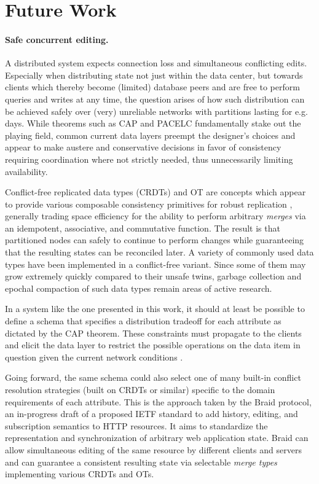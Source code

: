 \cleardoublepage
\section{Future Work}

\paragraph{Safe concurrent editing.}
A distributed system expects connection loss and simultaneous conflicting edits. Especially when distributing state not just within the data center, but towards clients which thereby become (limited) database peers and are free to perform queries and writes at any time, the question arises of how such distribution can be achieved safely over (very) unreliable networks with partitions lasting for e.g. days. While theorems such as CAP and PACELC fundamentally stake out the playing field, common current data layers preempt the designer's choices and appear to make austere and conservative decisions in favor of consistency requiring coordination where not strictly needed, thus unnecessarily limiting availability.

Conflict-free replicated data types (CRDTs) and \gls{OT} are concepts which appear to provide various composable consistency primitives for robust replication \cite{weilbach2015replikativ, weilbach2016decoupling}, generally trading space efficiency for the ability to perform arbitrary \emph{merges} via an idempotent, associative, and commutative function. The result is that partitioned nodes can safely to continue to perform changes while guaranteeing that the resulting states can be reconciled later. A variety of commonly used data types have been implemented in a conflict-free variant. Since some of them may grow extremely quickly compared to their unsafe twins, garbage collection and epochal compaction of such data types remain areas of active research.

In a system like the one presented in this work, it should at least be possible to define a schema that specifies a distribution tradeoff for each attribute as dictated by the \gls{CAP} theorem. These constraints must propagate to the clients and elicit the data layer to restrict the possible operations on the data item in question given the current network conditions \cite{emerick2014api}.

Going forward, the same schema could also select one of many built-in conflict resolution strategies (built on CRDTs or similar) specific to the domain requirements of each attribute. This is the approach taken by the Braid \cite{braid19} protocol, an in-progress draft of a proposed \gls{IETF} standard to add history, editing, and subscription semantics to HTTP resources. It aims to standardize the representation and synchronization of arbitrary web application state. Braid can allow simultaneous editing of the same resource by different clients and servers and can guarantee a consistent resulting state via selectable \emph{merge types} implementing various CRDTs and OTs.

